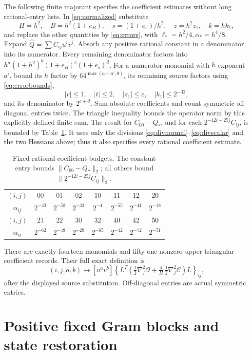\documentclass[10pt]{article}
\newcommand{\eps}{\varepsilon}
\begin{document}
The following finite majorant specifies the coefficient estimates
without long rational-entry lists. In \eqref{eq:normalized} substitute
\[
 H=h^2,\quad B=h^2(1+e_B),\quad s=(1+e_s)/h^2,\quad
 z=h^2z_1,\quad k=hk_1,
\]
and replace the other quantities by \eqref{eq:errors}, with
\(\ell_*=h^2/4,\alpha_*=h^4/8\). Expand
\(\widehat Q=\sum C_{ij}u^iv^j\).
Absorb any positive rational constant in a denominator into its numerator.
Every remaining denominator factors into
\(h^a(1+h^2)^b(1+e_B)^c(1+e_s)^d\).
For a numerator monomial with \(h\)-exponent \(a'\), bound its \(h\)
factor by \(64^{\max(a-a',0)}\), its remaining source factors using
\eqref{eq:errorbounds},
\[
 |r|\le1,\quad |t|\le2,\quad |z_1|\le\eps,\quad
 |k_1|\le2^{-32},
\]
and its denominator by \(2^{c+d}\). Sum absolute coefficients and
count symmetric off-diagonal entries twice. The triangle inequality
bounds the operator norm by this explicitly defined finite sum.
The result for \(C_{00}-Q_*\), and for each
\(2^{-12i-25j}C_{ij}\), is bounded by Table~\ref{tab:budgets}.
It uses only the divisions \eqref{eq:divnormal}--\eqref{eq:divscalar}
and the two Hessians above; thus it also specifies every rational
coefficient estimate.
\begin{table}[ht]
\centering\small
\begin{tabular}{c*{7}{c}}
\toprule
\((i,j)\)&00&01&02&10&11&12&20\\
\(\alpha_{ij}\)&\(2^{-40}\)&\(2^{-50}\)&\(2^{-33}\)&\(2^{-4}\)&\(2^{-55}\)&\(2^{-41}\)&\(2^{-18}\)\\
\midrule
\((i,j)\)&21&22&30&32&40&42&50\\
\(\alpha_{ij}\)&\(2^{-62}\)&\(2^{-48}\)&\(2^{-28}\)&\(2^{-65}\)&\(2^{-42}\)&\(2^{-72}\)&\(2^{-51}\)\\
\bottomrule
\end{tabular}
\caption{Fixed rational coefficient budgets. The constant entry bounds
\(\|C_{00}-Q_*\|_2\); all others bound
\(\|2^{-12i-25j}C_{ij}\|_2\).}\label{tab:budgets}
\end{table}
There are exactly fourteen monomials and fifty-one nonzero
upper-triangular coefficient records. Their full exact definition is
\[
 (i,j,a,b)\longmapsto
 [u^av^b]\left\{
 L^T\left(\tfrac12\nabla_f^2\mathcal O
        +\tfrac4H\,\tfrac12\nabla_f^2\mathcal C\right)L
 \right\}_{ij},
\]
after the displayed source substitution. Off-diagonal entries are
actual symmetric entries.

\section{Positive fixed Gram blocks and state restoration}
\end{document}
